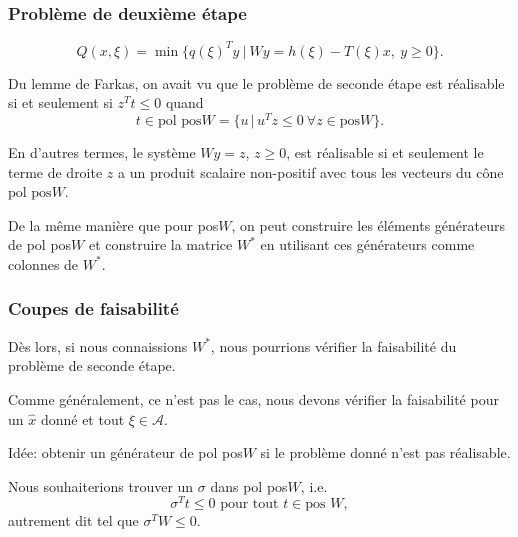 \begin{frame}
	\frametitle{Problème de deuxième étape}
	
	\[
	Q(x,\xi){=} \min \lbrace q(\xi)^Ty \ |\ Wy = h(\xi) - T(\xi)x,\ y \geq 0 \rbrace.
	\]
	
	\mbox{}
	
	Du lemme de Farkas, on avait vu que le problème de seconde étape est
	réalisable si et seulement si $z^Tt \leq 0$ quand 
	\[
	t \in \mbox{pol pos} W =
	\lbrace u \,|\, u^Tz \leq 0\ \forall z \in \mbox{pos} W \rbrace.
	\]
	
	\mbox{}
	
	En d'autres termes, le système $Wy = z$, $z \geq 0$, est réalisable si
	et seulement le terme de droite $z$ a un produit scalaire non-positif
	avec tous les vecteurs du cône $\mbox{pol pos} W$.
	
	\mbox{}
	
	De la même manière que pour pos$W$, on peut construire les éléments
	générateurs de pol pos$W$ et construire la matrice $W^*$ en utilisant
	ces générateurs comme colonnes de $W^*$.
\end{frame}

\begin{frame}
	\frametitle{Coupes de faisabilité}
	
	Dès lors, si nous connaissions $W^*$, nous pourrions vérifier la
	faisabilité du problème de seconde étape.
	
	\mbox{}
	
	Comme généralement, ce n'est pas le cas, nous devons vérifier la
	faisabilité pour un $\hat{x}$ donné et tout $\xi \in \mathcal{A}$.
	
	Idée: obtenir un générateur de pol pos$W$  si le problème donné n'est
	pas réalisable.
	
	\mbox{}
	
	Nous souhaiterions trouver un $\sigma$ dans pol pos$W$, i.e.
	\[
	\sigma^Tt \leq 0 \mbox{ pour tout } t \in \mbox{pos }W,
	\]
	autrement dit tel que $\sigma^TW \leq 0$.
	
\end{frame}

